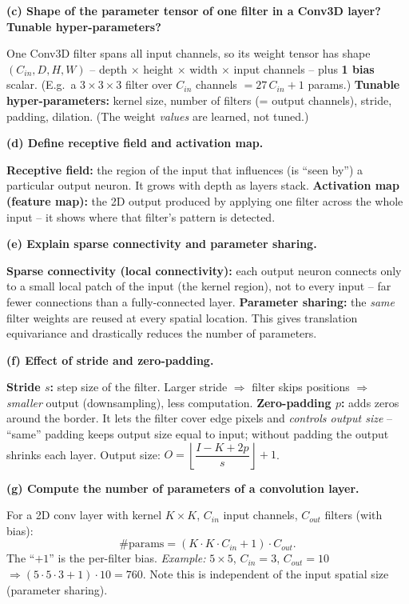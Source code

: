 \documentclass[10pt,a4paper]{article}
\begin{document}
\begin{enumerate}[leftmargin=*,label=\textbf{Q\arabic*.}]
\textbf{(c) Shape of the parameter tensor of one filter in a Conv3D layer? Tunable hyper-parameters?}
\begin{answerbox}
One Conv3D filter spans all input channels, so its weight tensor has shape $(C_{in}, D, H, W)$ -- depth $\times$ height $\times$ width $\times$ input channels -- plus \textbf{1 bias} scalar. (E.g.\ a $3\times3\times3$ filter over $C_{in}$ channels $= 27\,C_{in}+1$ params.)
\textbf{Tunable hyper-parameters:} kernel size, number of filters (= output channels), stride, padding, dilation. (The weight \emph{values} are learned, not tuned.)
\end{answerbox}

\textbf{(d) Define receptive field and activation map.}
\begin{answerbox}
\textbf{Receptive field:} the region of the input that influences (is ``seen by'') a particular output neuron. It grows with depth as layers stack.
\textbf{Activation map (feature map):} the 2D output produced by applying one filter across the whole input -- it shows where that filter's pattern is detected.
\end{answerbox}

\textbf{(e) Explain sparse connectivity and parameter sharing.}
\begin{answerbox}
\textbf{Sparse connectivity (local connectivity):} each output neuron connects only to a small local patch of the input (the kernel region), not to every input -- far fewer connections than a fully-connected layer.
\textbf{Parameter sharing:} the \emph{same} filter weights are reused at every spatial location. This gives translation equivariance and drastically reduces the number of parameters.
\end{answerbox}

\textbf{(f) Effect of stride and zero-padding.}
\begin{answerbox}
\textbf{Stride $s$:} step size of the filter. Larger stride $\Rightarrow$ filter skips positions $\Rightarrow$ \emph{smaller} output (downsampling), less computation.
\textbf{Zero-padding $p$:} adds zeros around the border. It lets the filter cover edge pixels and \emph{controls output size} -- ``same'' padding keeps output size equal to input; without padding the output shrinks each layer.
Output size: $O = \left\lfloor \dfrac{I - K + 2p}{s} \right\rfloor + 1$.
\end{answerbox}

\textbf{(g) Compute the number of parameters of a convolution layer.}
\begin{answerbox}
For a 2D conv layer with kernel $K\times K$, $C_{in}$ input channels, $C_{out}$ filters (with bias):
\[ \#\text{params} = (K \cdot K \cdot C_{in} + 1)\cdot C_{out}. \]
The ``$+1$'' is the per-filter bias. \emph{Example:} $5\times5$, $C_{in}=3$, $C_{out}=10$ $\Rightarrow (5\cdot5\cdot3+1)\cdot10 = 760$. Note this is independent of the input spatial size (parameter sharing).
\end{answerbox}


\end{enumerate}
\end{document}
